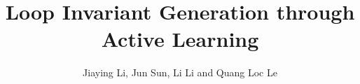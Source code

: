 \documentclass{llncs}
\begin{document}

\title{Loop Invariant Generation through Active Learning}

\author{Jiaying Li, Jun Sun, Li Li and Quang Loc Le}




\maketitle
\end{document}
